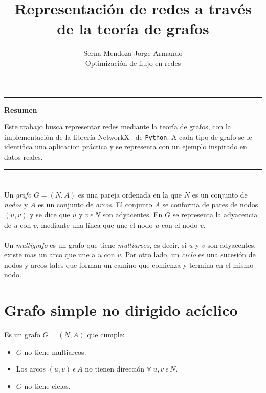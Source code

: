 \documentclass[a4paper, 11pt]{article}
\begin{document}
\title{Representación de redes a través de la teoría de grafos}
\author{Serna Mendoza Jorge Armando\\
\small{Optimización de flujo en redes}}
\date{ }
\maketitle

\vspace{-1 cm}
\begin{center}\rule{\textwidth}{0.1mm} \end{center}
\vspace{-1.3 cm}
\begin {center}
\item \Large{\textbf{ Resumen}}
\end {center}

Este trabajo busca representar redes mediante la teoría de grafos, con la implementación de la librería \color{blue}NetworkX\color{black} \  de \texttt{Python}. A cada tipo de grafo se le identifica una aplicacion práctica y  se representa con un ejemplo inspirado en datos reales.
\vspace{-0.5cm}
\begin{center}\rule{\textwidth}{0.1mm} \end{center}


\section*{}
Un \textit{grafo} $G=(N, A)$ es una pareja ordenada en la que $N$ es un conjunto de \textit{nodos} y $A$ es un conjunto de \textit{arcos}. El conjunto $A$ se conforma de pares de nodos $(u, v)$ y se dice que $u$ y $v \ \epsilon \ N$ son adyacentes. En $G$ se representa la adyacencia de $u$ con $v$, mediante una línea que une el nodo $u$ con el nodo $v$.
\\ \\
Un \textit{multigrafo} es un grafo que tiene \textit{multiarcos}, es decir,  si $u$ y $v$ son adyacentes, existe mas un arco que une a $u$ con $v$. Por otro lado, un \textit{ciclo} es una sucesión de nodos y arcos tales que forman un camino que comienza y termina en el mismo nodo. 

\section*{Grafo simple no dirigido acíclico}

Es un grafo $G = (N, A)$ que cumple:
\begin{itemize}
\item $G$ no tiene multiarcos.
\item Los arcos $(u, v) \ \epsilon \ A$ no tienen dirección $\forall \ u, v \ \epsilon \ N$.
\item $G$ no tiene ciclos.
\end{itemize}
\end{document}
